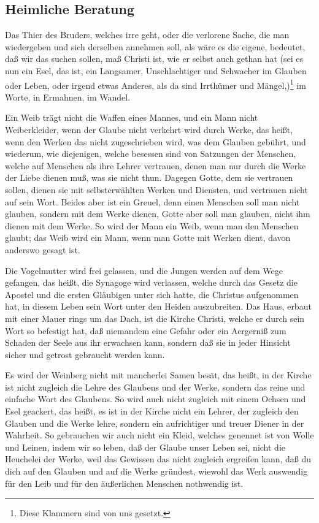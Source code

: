 \subsection{Heimliche Beratung}

Das Thier des Bruders, welches irre geht, oder die verlorene Sache, die man wiedergeben und sich derselben annehmen soll, als wäre es die eigene, bedeutet, daß wir das suchen sollen,
maß Christi ist, wie er selbst auch gethan hat (sei es nun ein Esel, das ist, ein Langsamer, Unschlachtiger und Schwacher im Glauben oder Leben, oder irgend etwas Anderes, als da sind Irrthümer und Mängel,)\footnote{Diese Klammern sind von uns gesetzt.} im Worte, in Ermahnen, im Wandel.

Ein Weib trägt nicht die Waffen eines Mannes, und ein Mann nicht Weiberkleider, wenn der Glaube nicht verkehrt wird durch Werke, das heißt, wenn den Werken das nicht zugeschrieben wird, was dem Glauben gebührt, und wiederum, wie diejenigen, welche besessen sind von Satzungen der Menschen, welche auf Menschen als ihre Lehrer vertrauen, denen man nur durch die Werke der Liebe dienen muß, was sie nicht thun. Dagegen Gotte, dem sie vertrauen sollen, dienen sie mit selbsterwählten Werken und Diensten, und vertrauen nicht auf sein Wort. Beides aber ist ein Greuel, denn einen Menschen soll man nicht glauben, sondern mit dem Werke dienen, Gotte aber soll man glauben, nicht ihm dienen mit dem Werke. So wird der Mann ein Weib, wenn man den Menschen glaubt; das Weib wird ein Mann, wenn man Gotte mit Werken dient, davon anderswo gesagt ist.

Die Vogelmutter wird frei gelassen, und die Jungen werden auf dem Wege gefangen, das heißt, die Synagoge wird verlassen, welche durch das Gesetz die Apostel und die ersten Gläubigen unter sich hatte, die Christus aufgenommen hat, in diesem Leben sein Wort unter den Heiden auszubreiten. Das Haus, erbaut mit einer Mauer rings um das Dach, ist die Kirche Christi, welche er durch sein Wort so befestigt hat, daß niemandem eine Gefahr oder ein Aergerniß zum Schaden der Seele aus ihr erwachsen kann, sondern daß sie in jeder Hinsicht sicher und getrost gebraucht werden kann.

Es wird der Weinberg nicht mit mancherlei Samen besät, das heißt, in der Kirche ist nicht zugleich die Lehre des Glaubens und der Werke, sondern das reine und einfache Wort des Glaubens. So wird auch nicht zugleich mit einem Ochsen und Esel geackert, das heißt, es ist in der Kirche nicht ein Lehrer, der zugleich den Glauben und die Werke lehre, sondern ein aufrichtiger und treuer Diener in der Wahrheit. So gebrauchen wir auch nicht ein Kleid, welches genennet ist von Wolle und Leinen, indem wir so leben, daß der Glaube unser Leben sei, nicht die Heuchelei der Werke, weil das Gewissen das nicht zugleich ergreifen kann, daß du dich auf den Glauben und auf die Werke gründest, wiewohl das Werk auswendig für den Leib und für den äußerlichen Menschen nothwendig ist.

